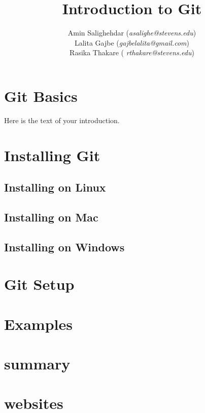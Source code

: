 \documentclass[a4paper,10pt]{article}
\begin{document}
\title{\textbf{Introduction to Git}}
\author{Amin Salighehdar (\textit{asalighe@stevens.edu})\\Lalita Gajbe (\textit{gajbelalita@gmail.com})\\ Rasika Thakare ( \textit{rthakare@stevens.edu}) }
\date{}
\maketitle

\section{Git Basics}
Here is the text of your introduction.

\section{Installing Git}
\subsection{Installing on Linux}
\subsection{Installing on Mac}
\subsection{Installing on Windows}
\section{Git Setup}
\section{Examples}
\section{summary}
\section{websites}

\end{document}

